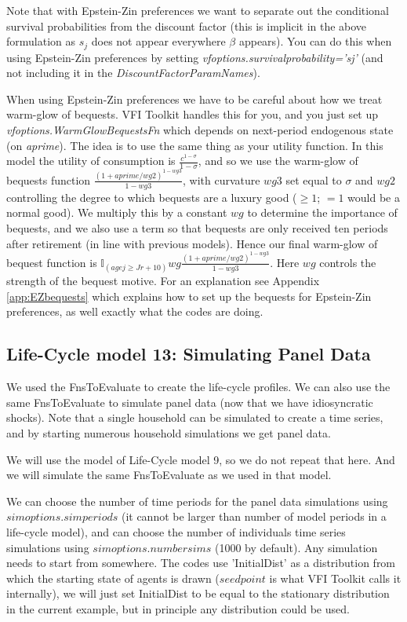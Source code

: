 Note that with Epstein-Zin preferences we want to separate out the conditional survival probabilities from the discount factor (this is implicit in the above formulation as $s_j$ does not appear everywhere $\beta$ appears). You can do this when using Epstein-Zin preferences by setting \textit{vfoptions.survivalprobability='sj'} (and not including it in the \textit{DiscountFactorParamNames}).

When using Epstein-Zin preferences we have to be careful about how we treat warm-glow of bequests. VFI Toolkit handles this for you, and you just set up \textit{vfoptions.WarmGlowBequestsFn} which depends on next-period endogenous state (on \textit{aprime}). The idea is to use the same thing as your utility function. In this model the utility of consumption is $\frac{c^{1-\sigma}}{1-\sigma}$, and so we use the warm-glow of bequests function $\frac{(1+aprime/wg2)^{1-wg3}}{1-wg3}$, with curvature $wg3$ set equal to $\sigma$ and $wg2$ controlling the degree to which bequests are a luxury good ($\geq 1$; $=1$ would be a normal good). We multiply this by a constant $wg$ to determine the importance of bequests, and  we also use a term so that bequests are only received ten periods after retirement (in line with previous models). Hence our final warm-glow of bequest function is $ \mathbb{I}_{(agej\geq Jr+10)}wg\frac{(1+aprime/wg2)^{1-wg3}}{1-wg3}$.
Here $wg$ controls the strength of the bequest motive. For an explanation see Appendix \ref{app:EZbequests} which explains how to set up the bequests for Epstein-Zin preferences, as well exactly what the codes are doing.

\subsection{Life-Cycle model 13: Simulating Panel Data}
We used the FnsToEvaluate to create the life-cycle profiles. We can also use the same FnsToEvaluate to simulate panel data (now that we have idiosyncratic shocks). Note that a single household can be simulated to create a time series, and by starting numerous household simulations we get panel data.

We will use the model of Life-Cycle model 9, so we do not repeat that here. And we will simulate the same FnsToEvaluate as we used in that model.

We can choose the number of time periods for the panel data simulations using $simoptions.simperiods$ (it cannot be larger than number of model periods in a life-cycle model), and can choose the number of individuals time series simulations using $simoptions.numbersims$ (1000 by default). Any simulation needs to start from somewhere. The codes use 'InitialDist' as a distribution from which the starting state of agents is drawn ($seedpoint$ is what VFI Toolkit calls it internally), we will just set InitialDist to be equal to the stationary distribution in the current example, but in principle any distribution could be used.


